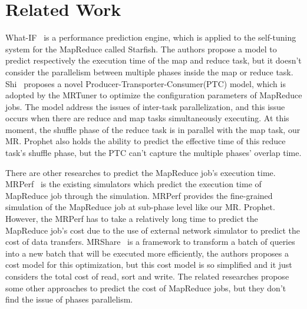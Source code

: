 \section{Related Work}
What-IF~\cite{Herodotou2011Profiling} is a performance prediction engine, which is applied to the self-tuning system for the MapReduce called Starfish\cite{Herodotos2011}. The authors propose a model to predict respectively the execution time of the map and reduce task, but it doesn't consider the parallelism between multiple phases inside the map or reduce task. Shi~\cite{Shi2014MRTuner} proposes a novel Producer-Transporter-Consumer(PTC) model, which is adopted by the MRTuner to optimize the configuration parameters of MapReduce jobs. The model address the issues of inter-task parallelization, and this issue occurs when there are reduce and map tasks simultaneously executing. At this moment, the shuffle phase of the reduce task is in parallel with the map task, our MR. Prophet also holds the ability to predict the effective time of this reduce task's shuffle phase, but the PTC can't capture the multiple phases' overlap time.

There are other researches to predict the MapReduce job's execution time. MRPerf~\cite{Wang2009A} is the existing simulators which predict the execution time of MapReduce job through the simulation. MRPerf provides the fine-grained simulation of the MapReduce job at sub-phase level like our MR. Prophet. However, the MRPerf has to take a relatively long time to predict the MapReduce job's cost due to the use of external network simulator to predict the cost of data transfers. MRShare~\cite{Nykiel2010MRShare} is a framework to transform a batch of queries into a new batch that will be executed more efficiently, the authors proposes a cost model for this optimization, but this cost model is so simplified and it just considers the total cost of read, sort and write. The related researches\cite{Song2013A}\cite{Lin2012A}\cite{Teng2011SimMapReduce} propose some other approaches to predict the cost of MapReduce jobs, but they don't find the issue of phases parallelism.
